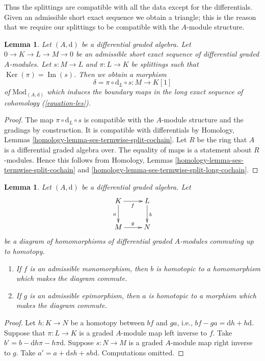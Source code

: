 \documentclass{stacks-project}
\theoremstyle{plain}
\newtheorem{lemma}[subsection]{Lemma}
\theoremstyle{definition}
\theoremstyle{remark}
\numberwithin{equation}{subsection}
\def\Ker{\mathop{\mathrm{Ker}}}
\def\Im{\mathop{\mathrm{Im}}}
\begin{document}
\noindent
Thus the splittings are compatible with all the data except for
the differentials. Given an admissible short exact sequence we
obtain a triangle; this is the reason that we require our splittings
to be compatible with the $A$-module structure.

\begin{lemma}
\label{lemma-admissible-ses}
Let $(A, \text{d})$ be a differential graded algebra.
Let $0 \to K \to L \to M \to 0$ be an admissible short exact sequence
of differential graded $A$-modules. Let $s : M \to L$ and $\pi : L \to K$
be splittings such that $\Ker(\pi) = \Im(s)$.
Then we obtain a morphism
$$
\delta = \pi \circ \text{d}_L \circ s : M \to K[1]
$$
of $\text{Mod}_{(A, \text{d})}$ which induces the boundary maps
in the long exact sequence of cohomology (\ref{equation-les}).
\end{lemma}

\begin{proof}
The map $\pi \circ \text{d}_L \circ s$ is compatible with the $A$-module
structure and the gradings by construction. It is compatible with
differentials by Homology, Lemmas
\ref{homology-lemma-ses-termwise-split-cochain}.
Let $R$ be the ring that $A$ is a differential graded algebra over.
The equality of maps is a statement about $R$-modules. Hence this
follows from Homology, Lemmas
\ref{homology-lemma-ses-termwise-split-cochain} and
\ref{homology-lemma-ses-termwise-split-long-cochain}.
\end{proof}

\begin{lemma}
\label{lemma-make-commute-map}
Let $(A, \text{d})$ be a differential graded algebra. Let
$$
\xymatrix{
K \ar[r]_f \ar[d]_a & L \ar[d]^b \\
M \ar[r]^g & N
}
$$
be a diagram of homomorphisms of differential graded $A$-modules
commuting up to homotopy.
\begin{enumerate}
\item If $f$ is an admissible monomorphism, then $b$ is homotopic to a
homomorphism which makes the diagram commute.
\item If $g$ is an admissible epimorphism, then $a$ is homotopic to a
morphism which makes the diagram commute.
\end{enumerate}
\end{lemma}

\begin{proof}
Let $h : K \to N$ be a homotopy between $bf$ and $ga$, i.e.,
$bf - ga = \text{d}h + h\text{d}$. Suppose that $\pi : L \to K$
is a graded $A$-module map left inverse to $f$. Take
$b' = b - \text{d}h\pi - h\pi \text{d}$.
Suppose $s : N \to M$ is a graded $A$-module map right inverse to $g$.
Take $a' = a + \text{d}sh + sh\text{d}$.
Computations omitted.
\end{proof}
\end{document}
